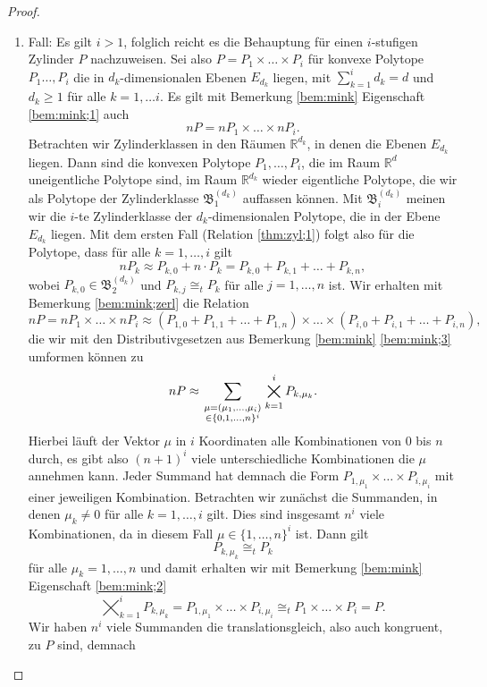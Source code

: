 \documentclass[11pt,titlepage]{article}
\newcommand{\setR}{\mathbb{R}}
\theoremstyle{definition}
\theoremstyle{remark}
\begin{document}
\begin{proof}
\begin{enumerate}
			\item Fall: Es gilt $i>1$, folglich reicht es die Behauptung für einen 
			$i$-stufigen Zylinder $P$ nachzuweisen. Sei also 
			$P=P_1\times\ldots \times P_i$ 
			für konvexe Polytope $P_1\ldots,P_i$ die in $d_k$-dimensionalen 
			Ebenen $E_{d_k}$ liegen, mit $\sum_{k=1}^i d_k =d$ und 
			$d_k\geq 1$ für alle $k=1,\ldots i$. 
			Es gilt mit Bemerkung \ref{bem:mink} Eigenschaft  
			\ref{bem:mink;1} auch 
			\[nP=nP_1\times\ldots\times nP_i.\]
			Betrachten wir Zylinderklassen in den Räumen $\setR^{d_k}$, in denen 
			die Ebenen $E_{d_k}$ liegen. Dann sind die konvexen Polytope 
			$P_1,\ldots,P_i$, die im Raum $\setR^d$ uneigentliche Polytope sind, 
			im Raum $\setR^{d_k}$ wieder eigentliche Polytope, die 
			wir als Polytope der Zylinderklasse $\mathfrak{B}_1^{(d_k)}$ 
			auffassen können. Mit $\mathfrak{B}_i^{(d_k)}$ meinen wir  
			die $i$-te Zylinderklasse der $d_k$-dimensionalen Polytope, die in 
			der Ebene $E_{d_k}$ liegen. Mit dem ersten Fall (Relation 
			\ref{thm:zyl;1}) folgt also für 
			die Polytope, dass für alle $k=1,\ldots,i$ gilt
			\[nP_k\approx P_{k,0}+n\cdot P_k=P_{k,0}+P_{k,1}+\ldots+P_{k,n},\]
			wobei $P_{k,0}\in \mathfrak{B}_2^{(d_k)}$ und $P_{k,j}\cong_t P_k$ 
			für alle $j =1,\ldots,n$ ist. Wir erhalten mit 
			Bemerkung \ref{bem:mink;zerl} die Relation 
			\[nP=nP_1\times\ldots\times nP_i \approx (P_{1,0}+P_{1,1}+\ldots+P_{1,n})
			\times\ldots\times (P_{i,0}+P_{i,1}+\ldots+P_{i,n}),\]
			die wir mit den Distributivgesetzen aus Bemerkung 
			\ref{bem:mink} \ref{bem:mink;3} 
			umformen können zu
			\[nP\approx \sum_{\genfrac{}{}{0pt}{1}{\mu=(\mu_1,\ldots,\mu_i)}{\in \{0,1,\ldots,n\}^i}}
			\bigtimes_{k=1}^i P_{k,\mu_k}.\]
			Hierbei läuft der Vektor $\mu$ in $i$ Koordinaten alle 
			Kombinationen von $0$ bis $n$ durch, es gibt also $(n+1)^i$ 
			viele unterschiedliche Kombinationen die $\mu$ annehmen kann. 
			Jeder Summand hat demnach die Form 
			$P_{1,\mu_1}\times\ldots\times P_{i,\mu_i}$ mit einer jeweiligen 
			Kombination. 
			Betrachten wir zunächst die Summanden, in denen $\mu_k\neq 0$ für alle 
			$k=1,\ldots,i$ gilt. Dies sind insgesamt $n^i$ viele Kombinationen, 
			da in diesem Fall $\mu\in\{1,\ldots,n\}^i$ ist. Dann gilt 
			\[P_{k,\mu_k}\cong_t P_k\]
			für alle $\mu_k=1,\ldots,n$ und damit erhalten wir mit 
			Bemerkung \ref{bem:mink} Eigenschaft \ref{bem:mink;2}
			\[\bigtimes_{k=1}^i P_{k,\mu_k}=
			P_{1,\mu_1}\times\ldots\times P_{i,\mu_i} \cong_t 
			P_1\times\ldots\times P_i =P.\]
			Wir haben $n^i$ viele Summanden die translationsgleich, also auch 
			kongruent, zu $P$ sind, demnach 

\end{enumerate}
\end{proof}
\end{document}
